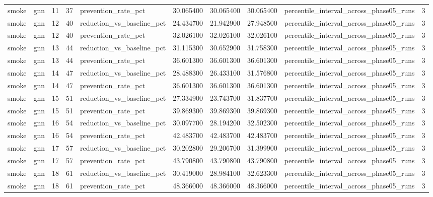\begin{tabular}{llrrlrrrlr}
smoke & gnn & 11 & 37 & prevention\_rate\_pct & 30.065400 & 30.065400 & 30.065400 & percentile\_interval\_across\_phase05\_runs & 3 \\
smoke & gnn & 12 & 40 & reduction\_vs\_baseline\_pct & 24.434700 & 21.942900 & 27.948500 & percentile\_interval\_across\_phase05\_runs & 3 \\
smoke & gnn & 12 & 40 & prevention\_rate\_pct & 32.026100 & 32.026100 & 32.026100 & percentile\_interval\_across\_phase05\_runs & 3 \\
smoke & gnn & 13 & 44 & reduction\_vs\_baseline\_pct & 31.115300 & 30.652900 & 31.758300 & percentile\_interval\_across\_phase05\_runs & 3 \\
smoke & gnn & 13 & 44 & prevention\_rate\_pct & 36.601300 & 36.601300 & 36.601300 & percentile\_interval\_across\_phase05\_runs & 3 \\
smoke & gnn & 14 & 47 & reduction\_vs\_baseline\_pct & 28.488300 & 26.433100 & 31.576800 & percentile\_interval\_across\_phase05\_runs & 3 \\
smoke & gnn & 14 & 47 & prevention\_rate\_pct & 36.601300 & 36.601300 & 36.601300 & percentile\_interval\_across\_phase05\_runs & 3 \\
smoke & gnn & 15 & 51 & reduction\_vs\_baseline\_pct & 27.334900 & 23.743700 & 31.837700 & percentile\_interval\_across\_phase05\_runs & 3 \\
smoke & gnn & 15 & 51 & prevention\_rate\_pct & 39.869300 & 39.869300 & 39.869300 & percentile\_interval\_across\_phase05\_runs & 3 \\
smoke & gnn & 16 & 54 & reduction\_vs\_baseline\_pct & 30.097700 & 28.194200 & 32.502300 & percentile\_interval\_across\_phase05\_runs & 3 \\
smoke & gnn & 16 & 54 & prevention\_rate\_pct & 42.483700 & 42.483700 & 42.483700 & percentile\_interval\_across\_phase05\_runs & 3 \\
smoke & gnn & 17 & 57 & reduction\_vs\_baseline\_pct & 30.202800 & 29.206700 & 31.399900 & percentile\_interval\_across\_phase05\_runs & 3 \\
smoke & gnn & 17 & 57 & prevention\_rate\_pct & 43.790800 & 43.790800 & 43.790800 & percentile\_interval\_across\_phase05\_runs & 3 \\
smoke & gnn & 18 & 61 & reduction\_vs\_baseline\_pct & 30.419000 & 28.984100 & 32.623300 & percentile\_interval\_across\_phase05\_runs & 3 \\
smoke & gnn & 18 & 61 & prevention\_rate\_pct & 48.366000 & 48.366000 & 48.366000 & percentile\_interval\_across\_phase05\_runs & 3 \\

\end{tabular}
